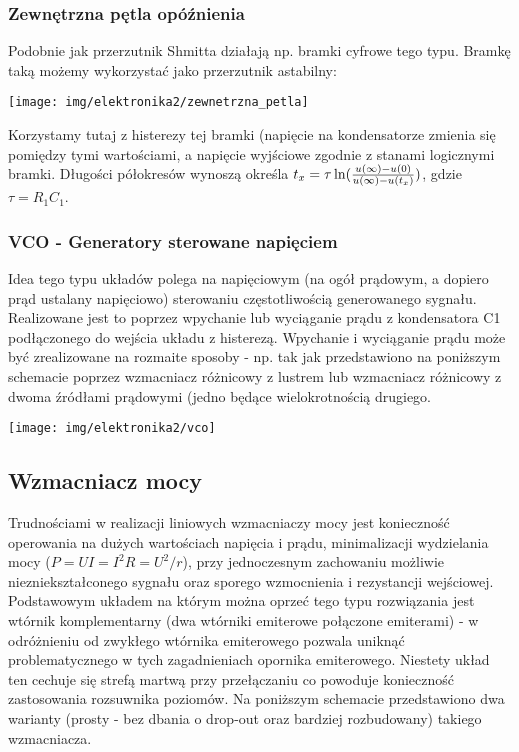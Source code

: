 \documentclass{pdfBooklets}
\begin{document}
\subsubsection{Zewnętrzna pętla opóźnienia}
Podobnie jak przerzutnik Shmitta działają np. bramki cyfrowe tego typu.
Bramkę taką możemy wykorzystać jako przerzutnik astabilny:
\begin{center}\texttt{[image: img/elektronika2/zewnetrzna\_petla]}\end{center}
Korzystamy tutaj z histerezy tej bramki (napięcie na kondensatorze zmienia się pomiędzy tymi wartościami, a napięcie wyjściowe zgodnie z stanami logicznymi bramki.
Długości półokresów wynoszą określa $t_x = \tau \ln({u(\infty) - u(0) \over u(\infty) - u(t_x)})$, gdzie $\tau = R_1 C_1$.

\subsubsection{VCO - Generatory sterowane napięciem}
Idea tego typu układów polega na napięciowym (na ogół prądowym, a dopiero prąd ustalany napięciowo) sterowaniu częstotliwością generowanego sygnału.
Realizowane jest to poprzez wpychanie lub wyciąganie prądu z kondensatora C1 podłączonego do wejścia układu z histerezą.
Wpychanie i wyciąganie prądu może być zrealizowane na rozmaite sposoby - np. tak jak przedstawiono na poniższym schemacie poprzez wzmacniacz różnicowy z lustrem lub wzmacniacz różnicowy z dwoma źródłami prądowymi (jedno będące wielokrotnością drugiego.

\begin{center}\texttt{[image: img/elektronika2/vco]}\end{center}

\subsection{Wzmacniacz mocy}

Trudnościami w realizacji liniowych wzmacniaczy mocy jest konieczność operowania na dużych wartościach napięcia i prądu, minimalizacji wydzielania mocy ($P=UI=I^2R=U^2/r$), przy jednoczesnym zachowaniu możliwie niezniekształconego sygnału oraz sporego wzmocnienia i rezystancji wejściowej.
Podstawowym układem na którym można oprzeć tego typu rozwiązania jest wtórnik komplementarny (dwa wtórniki emiterowe połączone emiterami) - w odróżnieniu od zwykłego wtórnika emiterowego pozwala uniknąć problematycznego w tych zagadnieniach opornika emiterowego.
Niestety układ ten cechuje się strefą martwą przy przełączaniu co powoduje konieczność zastosowania rozsuwnika poziomów.
Na poniższym schemacie przedstawiono dwa warianty (prosty - bez dbania o drop-out oraz bardziej rozbudowany) takiego wzmacniacza. 
\end{document}
